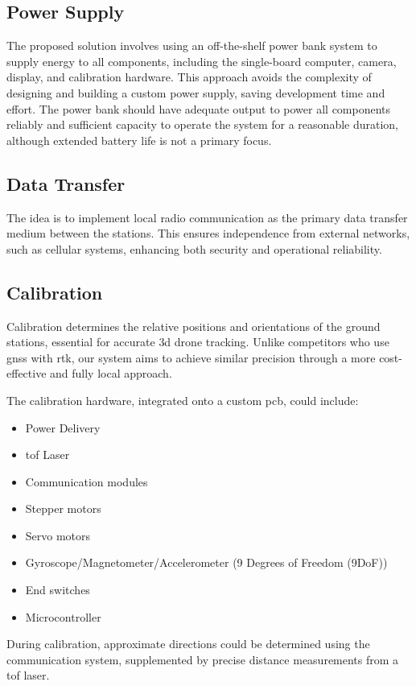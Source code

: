 \subsection{Power Supply}
The proposed solution involves using an off-the-shelf power bank system to supply energy to all components, including the single-board computer, camera, display, and calibration hardware. This approach avoids the complexity of designing and building a custom power supply, saving development time and effort. The power bank should have adequate output to power all components reliably and sufficient capacity to operate the system for a reasonable duration, although extended battery life is not a primary focus.

\subsection{Data Transfer}
The idea is to implement local radio communication as the primary data transfer medium between the stations. This ensures independence from external networks, such as cellular systems, enhancing both security and operational reliability.

\subsection{Calibration}
Calibration determines the relative positions and orientations of the ground stations, essential for accurate \acrshort{3d} drone tracking. Unlike competitors who use \acrshort{gnss} with \acrshort{rtk}, our system aims to achieve similar precision through a more cost-effective and fully local approach. 

The calibration hardware, integrated onto a custom \acrfull{pcb}, could include:
\begin{itemize}
	\item Power Delivery
	\item \acrfull{tof} Laser
	\item Communication modules
	\item Stepper motors
	\item Servo motors
	\item Gyroscope/Magnetometer/Accelerometer (9 Degrees of Freedom (9DoF))
	\item End switches
	\item Microcontroller
\end{itemize}

During calibration, approximate directions could be determined using the communication system, supplemented by precise distance measurements from a \acrshort{tof} laser.


